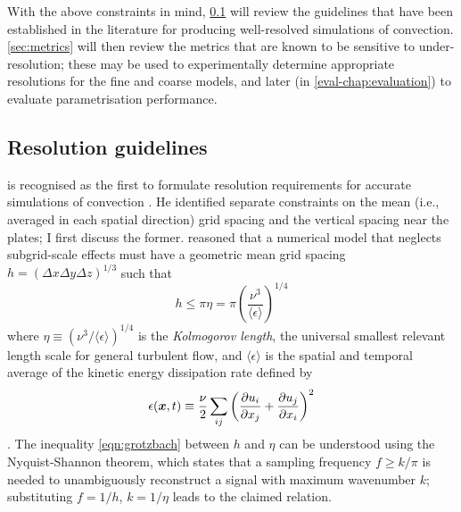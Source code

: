 \documentclass[../main.tex]{subfiles}
\begin{document}
With the above constraints in mind, \cref{sec:res_requirements} will review the
guidelines that have been established in the literature for producing
well-resolved simulations of \rb{} convection. \cref{sec:metrics} will
then review the metrics that are known to be sensitive to under-resolution;
these may be used to experimentally determine appropriate resolutions for the
fine and coarse models, and later (in \cref{eval-chap:evaluation}) to evaluate
parametrisation performance.


\subsection{Resolution guidelines}
\label{sec:res_requirements}

\textcite{grotzbach1983} is recognised as the first to formulate resolution
requirements for accurate simulations of \rb{} convection
\parencite{chilla2012,scheel2013}. He identified separate constraints on the
mean (i.e., averaged in each spatial direction) grid spacing and the vertical
spacing near the plates; I first discuss the former. \citeauthor{grotzbach1983}
reasoned that a numerical model that neglects subgrid-scale effects must have a
geometric mean grid spacing $h = (\Delta x \Delta y \Delta z)^{1/3}$ such that
\begin{equation}
    \label{eqn:grotzbach}
    h \leq \pi \eta = \pi \left(
        \frac{\nu^3}{\langle \epsilon \rangle}
    \right)^{1/4}
\end{equation}
where $\eta \equiv (\nu^3/\langle \epsilon \rangle)^{1/4}$ is the
\emph{Kolmogorov length}, the universal smallest relevant length scale for
general turbulent flow, and $\langle \epsilon \rangle$ is the spatial and
temporal average of the kinetic energy dissipation rate defined by
\begin{equation}
    \label{eqn:kinetic_dissipation}
    \epsilon(\bm{x}, t) \equiv \frac{\nu}{2} \sum_{ij} \left(
        \frac{\partial u_i}{\partial x_j} + \frac{\partial u_j}{\partial x_i}
    \right)^2
\end{equation}
\parencite{chilla2012}. The inequality \cref{eqn:grotzbach} between $h$ and
$\eta$ can be understood using the Nyquist-Shannon theorem, which states that a
sampling frequency $f \geq k/\pi$ is needed to unambiguously reconstruct a
signal with maximum wavenumber $k$; substituting $f = 1/h$, $k = 1/\eta$ leads
to the claimed relation.
\end{document}
